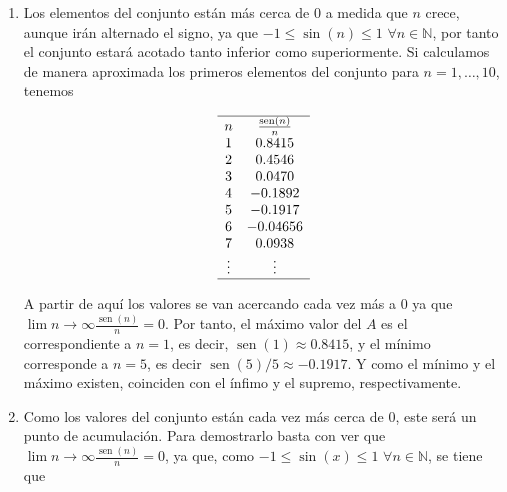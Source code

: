 \documentclass[
  spanish,
  a4paper,
]{scrreport}
\theoremstyle{definition}
\theoremstyle{remark}
\begin{document}
\begin{tcolorbox}[enhanced jigsaw, arc=.35mm, bottomrule=.15mm, bottomtitle=1mm, breakable, colback=white, colbacktitle=quarto-callout-tip-color!10!white, colframe=quarto-callout-tip-color-frame, coltitle=black, left=2mm, leftrule=.75mm, opacityback=0, opacitybacktitle=0.6, rightrule=.15mm, title=\textcolor{quarto-callout-tip-color}{\faLightbulb}\hspace{0.5em}{Solución}, titlerule=0mm, toprule=.15mm, toptitle=1mm]

\begin{enumerate}
\def\labelenumi{\alph{enumi}.}
\item
  Los elementos del conjunto están más cerca de 0 a medida que \(n\)
  crece, aunque irán alternado el signo, ya que
  \(-1\leq\operatorname{sin}(n)\leq 1\) \(\forall n\in \mathbb{N}\), por
  tanto el conjunto estará acotado tanto inferior como superiormente. Si
  calculamos de manera aproximada los primeros elementos del conjunto
  para \(n=1,\ldots,10\), tenemos

  \[
  \begin{array}{cc}
  \hline
  n &  \frac{\operatorname{sen}(n)}{n} \\
  1 & 0.8415 \\
  2 & 0.4546 \\
  3 & 0.0470 \\
  4 & -0.1892 \\
  5 & -0.1917 \\
  6 & -0.04656 \\
  7 & 0.0938 \\
  \vdots & \vdots \\
  \hline
  \end{array}
  \]

  A partir de aquí los valores se van acercando cada vez más a 0 ya que
  \(\lim{n\to \infty}\frac{\operatorname{sen}(n)}{n} = 0\). Por tanto,
  el máximo valor del \(A\) es el correspondiente a \(n=1\), es decir,
  \(\operatorname{sen}(1)\approx 0.8415\), y el mínimo corresponde a
  \(n=5\), es decir \(\operatorname{sen}(5)/5  \approx -0.1917\). Y como
  el mínimo y el máximo existen, coinciden con el ínfimo y el supremo,
  respectivamente.
\item
  Como los valores del conjunto están cada vez más cerca de \(0\), este
  será un punto de acumulación. Para demostrarlo basta con ver que
  \(\lim{n\to \infty}\frac{\operatorname{sen}(n)}{n} = 0\), ya que, como
  \(-1\leq\operatorname{sin}(x)\leq 1\) \(\forall n\in \mathbb{N}\), se
  tiene que


\end{enumerate}
\end{tcolorbox}
\end{document}
